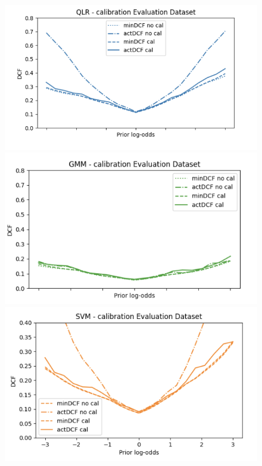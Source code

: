 \documentclass{article}
\begin{document}
\begin{figure}[H]
    \centering
    \begin{minipage}{.4\textwidth}
        \centering
        \includegraphics[width=\linewidth]{./img/EVAL1.png}
    \end{minipage}%
    \begin{minipage}{.4\textwidth}
        \centering
        \includegraphics[width=\linewidth]{./img/EVAL2.png}
    \end{minipage}
    \begin{minipage}{.4\textwidth}
        \centering
        \includegraphics[width=\linewidth]{./img/EVAL3.png}

\end{minipage}
\end{figure}
\end{document}
